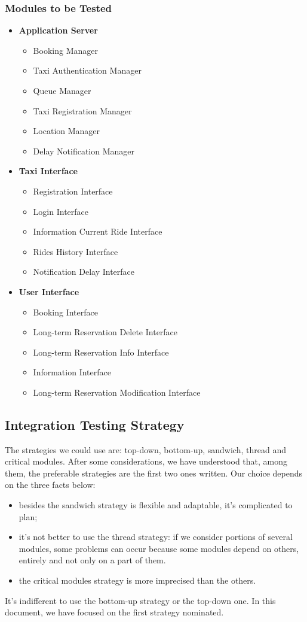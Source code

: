 		\subsubsection{Modules to be Tested}
		
		\begin{itemize}
			\item \textbf{Application Server}
			\begin{itemize}
				\item Booking Manager
				\item Taxi Authentication Manager
				\item Queue Manager
				\item Taxi Registration Manager
				\item Location Manager
				\item Delay Notification Manager
			\end{itemize}
			\item \textbf{Taxi Interface}
			\begin{itemize}
				\item Registration Interface
				\item Login Interface
				\item Information Current Ride Interface
				\item Rides History Interface
				\item Notification Delay Interface
			\end{itemize}
			\item \textbf{User Interface}
			\begin{itemize}
				\item Booking Interface
				\item Long-term Reservation Delete Interface
				\item Long-term Reservation Info Interface
				\item Information Interface
				\item Long-term Reservation Modification Interface
			\end{itemize}
		\end{itemize}
\subsection{Integration Testing Strategy}
The strategies we could use are: top-down, bottom-up, sandwich, thread and critical modules. After some considerations, we have understood that, among them, the preferable strategies are the first two ones written. Our choice depends on the three facts below:
	\begin{itemize}
		\item besides the sandwich strategy is flexible and adaptable, it's complicated to plan;
		\item it's not better to use the thread strategy: if we consider portions of several modules, some problems can occur because some modules depend on 		others, entirely and not only on a part of them.
		\item the critical modules strategy is more imprecised than the others.      
	\end{itemize} 
It's indifferent to use the bottom-up strategy or the top-down one. In this document, we have focused on the first strategy nominated.
